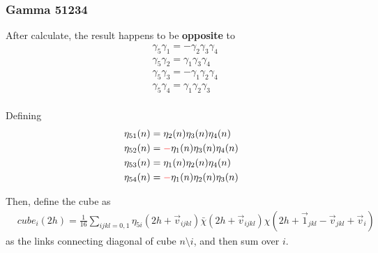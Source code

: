 \subsubsection{\label{sec:gamma51234ks}Gamma 51234}

After calculate, the result happens to be \textbf{opposite} to
\begin{equation}
\begin{split}
&\gamma_5\gamma_1 = -\gamma_2\gamma_3\gamma_4\\
&\gamma_5\gamma_2 =  \gamma_1\gamma_3\gamma_4\\
&\gamma_5\gamma_3 = -\gamma_1\gamma_2\gamma_4\\
&\gamma_5\gamma_4 =  \gamma_1\gamma_2\gamma_3\\
\end{split}
\end{equation} 

Defining
\begin{equation}
\begin{split}
&\eta _{51}(n) = \eta_2(n)\eta_3(n)\eta_4(n)\\
&\eta _{52}(n) = \textcolor[rgb]{1,0,0}{-}\eta_1(n)\eta_3(n)\eta_4(n)\\
&\eta _{53}(n) = \eta_1(n)\eta_2(n)\eta_4(n)\\
&\eta _{54}(n) = \textcolor[rgb]{1,0,0}{-}\eta_1(n)\eta_2(n)\eta_3(n)\\
\end{split}
\end{equation} 

Then, define the cube as
\begin{equation}
\begin{split}
&cube_{i}(2h)=\frac{1}{16}\sum _{ijkl=0, 1} \eta _{5i}(2h+\vec{v}_{ijkl})\bar{\chi}(2h+\vec{v}_{ijkl})\chi(2h+\vec{1}_{jkl}-\vec{v}_{jkl} + \vec{v}_{i})
\end{split}
\end{equation}
as the links connecting diagonal of cube $n\setminus i$, and then sum over $i$.

